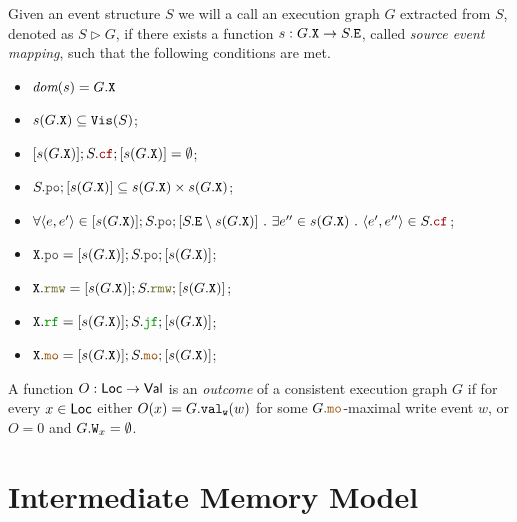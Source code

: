 \documentclass[12pt]{article}
\begin{document}
\begin{definition}
  Given an event structure $S$ we will a call an execution graph $G$
  extracted from $S$, denoted as $S \rhd G$,
  if there exists a function $s : G.{\mathtt{X}} \rightarrow S.{\mathtt{E}}$, called \emph{source event mapping},
  such that the following conditions are met.
  \begin{itemize}
    \item $\textit{dom}{({s})} = G.{\mathtt{X}}$
    \item $s(G.{\mathtt{X}}) \subseteq {\mathtt{Vis}}(S)$;
    \item $[s(G.\lX)];S.\lCF;[s(G.\lX)] = \emptyset$;
    \item $S.\lPO;[s(G.\lX)] \subseteq s(G.\lX) \times s(G.\lX)$;
    \item $\forall{\tup{e, e'}} \in [s(G.\lX)];S.\lPO;[S.\lE \setminus s(G.\lX)] ~.~ 
      \exists{e''} \in s(G.\lX) ~.~ \tup{e', e''} \in S.\lCF$;
    \item $\lX.\lPO = [s(G.\lX)];S.\lPO;[s(G.\lX)]$;
    \item $\lX.\lRMW = [s(G.\lX)];S.\lRMW;[s(G.\lX)]$;
    \item $\lX.\lRF = [s(G.\lX)];S.\lJF;[s(G.\lX)]$;
    \item $\lX.\lMO = [s(G.\lX)];S.\lMO;[s(G.\lX)]$;
  \end{itemize}
\end{definition}

\begin{definition}
  A function $O : \mathsf{Loc} \rightarrow \mathsf{Val}$ is an \emph{outcome} 
  of a consistent execution graph $G$
  if for every $x \in \mathsf{Loc}$ either $O(x) = G.{\mathtt{val_w}}(w)$ 
  for some $G.\lMO$-maximal write event $w$, 
  or $O = 0$ and $G.{\mathtt{W}}_x = \emptyset$.
\end{definition}

\section{Intermediate Memory Model}
\end{document}

